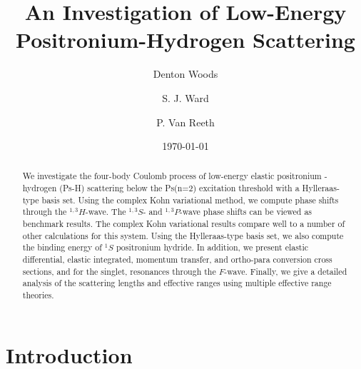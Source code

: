 \documentclass[preprint,showpacs,showkeys,preprintnumbers,amsmath,amssymb,longbibliography,pra,aps]{revtex4-1}
\begin{document}

\title{An Investigation of Low-Energy Positronium-Hydrogen Scattering}

\author{Denton Woods}

\author{S. J. Ward}

\author{P. Van Reeth}

\date{\today}

\begin{abstract}
We investigate the four-body Coulomb process of low-energy elastic positronium
-hydrogen (Ps-H) scattering below the Ps(n=2) excitation threshold with a 
Hylleraas-type basis set. Using the complex Kohn variational method, we 
compute phase shifts through the $^{1,3}H$-wave. The $^{1,3}S$- and
$^{1,3}P$-wave phase shifts can be viewed as benchmark results. The complex
Kohn variational results compare well to a number of other calculations for 
this system. Using the Hylleraas-type basis set, we also compute the binding 
energy of $^1S$ positronium hydride. In addition, we present elastic 
differential, elastic integrated, momentum transfer, and ortho-para 
conversion cross sections, and for the singlet, resonances through the
$F$-wave. Finally, we give a detailed analysis of the scattering lengths and 
effective ranges using multiple effective range theories.
\end{abstract}

   
\maketitle

\section{\label{sec:Intro}\protect Introduction}


\end{document}
